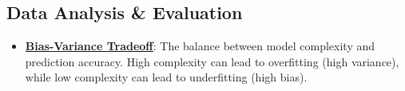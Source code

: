 \documentclass{article}%
\begin{document}
%
\subsection{Data Analysis \& Evaluation}%
\label{subsec:DataAnalysisEvaluation}%
\begin{itemize}[leftmargin=*]%
\item \href{https://purdue.brightspace.com/d2l/common/assets/pdfjs-d2l-dist/1.0.14-legacy/web/viewer.html?file=\%2Fcontent\%2Fenforced\%2F1095467-wl.202510.CS.24300.001\%2F11L2-svd-pca-recommender.pdf\%3Fou\%3D1095467\&lang=en-us\&container=d2l-fileviewer-rendered-pdf\&fullscreen=d2l-fileviewer-rendered-pdf-dialog\&height=667#page=53}{\textbf{Bias-Variance Tradeoff}}: The balance between model complexity and prediction accuracy. High complexity can lead to overfitting (high variance), while low complexity can lead to underfitting (high bias).%
\end{itemize}

%
\end{document}
